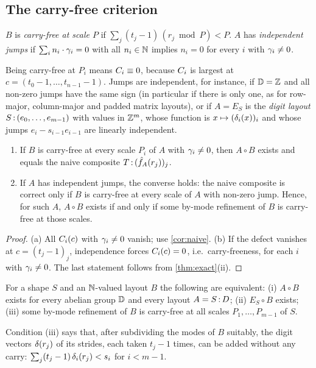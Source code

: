 \subsection{The carry-free criterion}

\begin{definition}\label{def:carryfree}
$B$ is \emph{carry-free at scale $P$} if $\sum_j(t_j-1)\,(r_j\bmod P)<P$. $A$ has
\emph{independent jumps} if $\sum_in_i\cdot\gamma_i=0$ with all $n_i\in\mathbb{N}$ implies $n_i=0$ for
every $i$ with $\gamma_i\neq0$.
\end{definition}
\noindent Being carry-free at $P_i$ means $C_i\equiv0$, because $C_i$ is largest at
$c=(t_0-1,\dots,t_{n-1}-1)$. Jumps are independent, for instance, if $\mathbb{D}=\mathbb{Z}$ and all non-zero
jumps have the same sign (in particular if there is only one, as for row-major, column-major and
padded matrix layouts), or if $A=E_S$ is the \emph{digit layout}
$S\,{:}\,(e_0,\dots,e_{m-1})$ with values in $\mathbb{Z}^m$, whose function is $x\mapsto(\delta_i(x))_i$ and
whose jumps $e_i-s_{i-1}e_{i-1}$ are linearly independent.

\begin{theorem}\label{thm:carryfree}
\begin{enumerate}[label=(\alph*),itemsep=1pt]
\item If $B$ is carry-free at every scale $P_i$ of $A$ with $\gamma_i\neq0$, then $A\circ B$ exists
 and equals the naive composite $T\,{:}\,(\hat{f}_{A}(r_j))_j$.
\item If $A$ has independent jumps, the converse holds: the naive composite is correct only if
 $B$ is carry-free at every scale of $A$ with non-zero jump. Hence, for such $A$, $A\circ B$
 exists if and only if some by-mode refinement of $B$ is carry-free at those scales.
\end{enumerate}
\end{theorem}
\begin{proof}
(a) All $C_i(c)$ with $\gamma_i\ne0$ vanish; use \cref{cor:naive}. (b) If the defect vanishes at
$c=(t_j-1)_j$, independence forces $C_i(c)=0$, i.e.\ carry-freeness, for each $i$ with
$\gamma_i\neq0$. The last statement follows from \cref{thm:exact}(ii).
\end{proof}

\begin{corollary}\label{cor:universal}
For a shape $S$ and an $\mathbb{N}$-valued layout $B$ the following are equivalent: (i) $A\circ B$ exists
for every abelian group $\mathbb{D}$ and every layout $A=S\,{:}\,D$; (ii) $E_S\circ B$ exists; (iii) some
by-mode refinement of $B$ is carry-free at all scales $P_1,\dots,P_{m-1}$ of $S$.
\end{corollary}
\noindent Condition (iii) says that, after subdividing the modes of $B$ suitably, the digit vectors
$\delta(r_j)$ of its strides, each taken $t_j-1$ times, can be added without any carry:
$\sum_j(t_j-1)\,\delta_i(r_j)<s_i$ for $i<m-1$.

